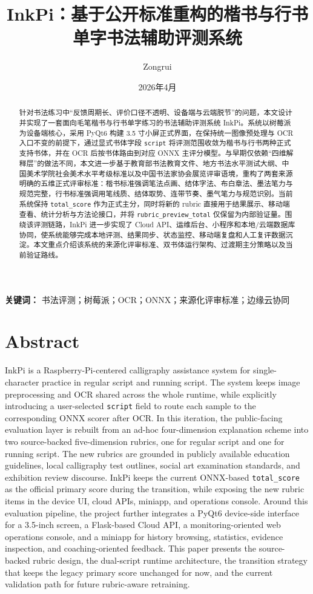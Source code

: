 \documentclass[UTF8,a4paper,12pt,fontset=none]{ctexart}
\title{InkPi：基于公开标准重构的楷书与行书单字书法辅助评测系统}
\author{Zongrui}
\date{2026年4月}
\begin{document}
\maketitle

\begin{abstract}
针对书法练习中“反馈周期长、评价口径不透明、设备端与云端脱节”的问题，本文设计并实现了一套面向毛笔楷书与行书单字练习的书法辅助评测系统 InkPi。系统以树莓派为设备端核心，采用 PyQt6 构建 3.5 寸小屏正式界面，在保持统一图像预处理与 OCR 入口不变的前提下，通过显式书体字段 \texttt{script} 将评测范围收敛为楷书与行书两种正式支持书体，并在 OCR 后按书体路由到对应 ONNX 主评分模型。与早期仅依赖“四维解释层”的做法不同，本文进一步基于教育部书法教育文件、地方书法水平测试大纲、中国美术学院社会美术水平考级标准以及中国书法家协会展览评审语境，重构了两套来源明确的五维正式评审标准：楷书标准强调笔法点画、结体字法、布白章法、墨法笔力与规范完整，行书标准强调用笔线质、结体取势、连带节奏、墨气笔力与规范识别。当前系统保持 \texttt{total\_score} 作为正式主分，同时将新的 rubric 直接用于结果展示、移动端查看、统计分析与方法论接口，并将 \texttt{rubric\_preview\_total} 仅保留为内部验证量。围绕该评测链路，InkPi 进一步实现了 Cloud API、运维后台、小程序和本地/云端数据库协同，使系统能够完成本地评测、结果同步、状态监控、移动端复盘和人工复评数据沉淀。本文重点介绍该系统的来源化评审标准、双书体运行架构、过渡期主分策略以及当前验证路线。
\end{abstract}

\noindent\textbf{关键词：} 书法评测；树莓派；OCR；ONNX；来源化评审标准；边缘云协同

\section*{Abstract}
InkPi is a Raspberry-Pi-centered calligraphy assistance system for single-character practice in regular script and running script. The system keeps image preprocessing and OCR shared across the whole runtime, while explicitly introducing a user-selected \texttt{script} field to route each sample to the corresponding ONNX scorer after OCR. In this iteration, the public-facing evaluation layer is rebuilt from an ad-hoc four-dimension explanation scheme into two source-backed five-dimension rubrics, one for regular script and one for running script. The new rubrics are grounded in publicly available education guidelines, local calligraphy test outlines, social art examination standards, and exhibition review discourse. InkPi keeps the current ONNX-based \texttt{total\_score} as the official primary score during the transition, while exposing the new rubric items in the device UI, cloud APIs, miniapp, and operations console. Around this evaluation pipeline, the project further integrates a PyQt6 device-side interface for a 3.5-inch screen, a Flask-based Cloud API, a monitoring-oriented web operations console, and a miniapp for history browsing, statistics, evidence inspection, and coaching-oriented feedback. This paper presents the source-backed rubric design, the dual-script runtime architecture, the transition strategy that keeps the legacy primary score unchanged for now, and the current validation path for future rubric-aware retraining.
\end{document}

